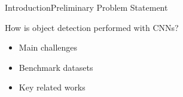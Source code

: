 \begin{frame}{Introduction}{Preliminary Problem Statement}
    \begin{block}{}
        How is object detection performed with CNNs?
        \begin{itemize}
            \item Main challenges
            \item Benchmark datasets
            \item Key related works
        \end{itemize}
    \end{block}
\end{frame}